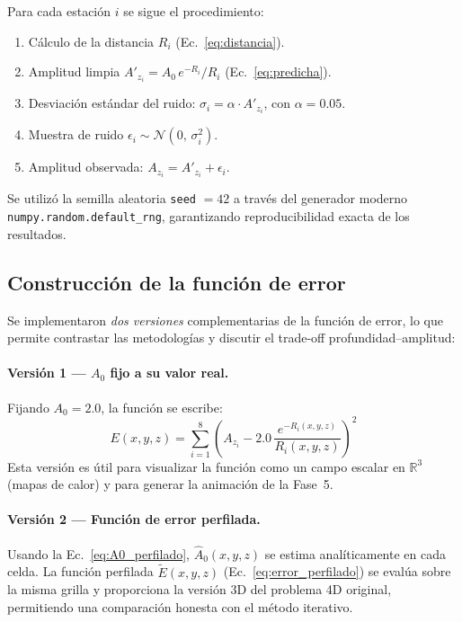 \documentclass[12pt, a4paper]{article}
\begin{document}
Para cada estación $i$ se sigue el procedimiento:

\begin{enumerate}[itemsep=2pt]
    \item Cálculo de la distancia $R_i$ (Ec.~\ref{eq:distancia}).
    \item Amplitud limpia $A'_{z_i} = A_0\,e^{-R_i}/R_i$
    (Ec.~\ref{eq:predicha}).
    \item Desviación estándar del ruido:
    $\sigma_i = \alpha \cdot A'_{z_i}$, con $\alpha = 0.05$.
    \item Muestra de ruido $\epsilon_i \sim \mathcal{N}(0,\,\sigma_i^2)$.
    \item Amplitud observada: $A_{z_i} = A'_{z_i} + \epsilon_i$.
\end{enumerate}

Se utilizó la semilla aleatoria \texttt{seed} $= 42$ a través del
generador moderno \texttt{numpy.random.default\_rng}, garantizando
reproducibilidad exacta de los resultados.

\subsection{Construcción de la función de error}

Se implementaron \emph{dos versiones} complementarias de la función
de error, lo que permite contrastar las metodologías y discutir el
trade-off profundidad--amplitud:

\paragraph{Versión 1 — $A_0$ fijo a su valor real.}
Fijando $A_0 = 2.0$, la función se escribe:
\begin{equation}
    E(x, y, z) = \sum_{i=1}^{8}
    \left(A_{z_i} - 2.0\,\frac{e^{-R_i(x,y,z)}}{R_i(x,y,z)}\right)^2
    \label{eq:error_explicito}
\end{equation}
Esta versión es útil para visualizar la función como un campo
escalar en $\mathbb{R}^3$ (mapas de calor) y para generar la
animación de la Fase~5.

\paragraph{Versión 2 — Función de error perfilada.}
Usando la Ec.~\eqref{eq:A0_perfilado}, $\widehat{A}_0(x,y,z)$ se
estima analíticamente en cada celda. La función perfilada
$\widetilde{E}(x,y,z)$ (Ec.~\ref{eq:error_perfilado}) se evalúa
sobre la misma grilla y proporciona la versión 3D del problema 4D
original, permitiendo una comparación honesta con el método
iterativo.
\end{document}
